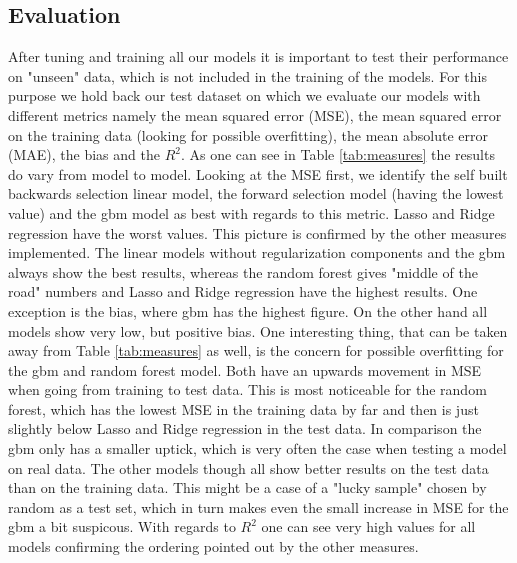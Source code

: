 \subsection{Evaluation}
After tuning and training all our models it is important to test their performance on "unseen" data, which is not included in the training of the models. For this purpose we hold back our test dataset on which we evaluate our models with different metrics namely the mean squared error (MSE), the mean squared error on the training data (looking for possible overfitting), the mean absolute error (MAE), the bias and the $R^2$. As one can see in Table \ref{tab:measures} the results do vary from model to model. Looking at the MSE first, we identify the self built backwards selection linear model, the forward selection model (having the lowest value) and the gbm model as best with regards to this metric. Lasso and Ridge regression have the worst values. This picture is confirmed by the other measures implemented. The linear models without regularization components and the gbm always show the best results, whereas the random forest gives "middle of the road" numbers and Lasso and Ridge regression have the highest results. One exception is the bias, where gbm has the highest figure. On the other hand all models show very low, but positive bias. One interesting thing, that can be taken away from Table \ref{tab:measures} as well, is the concern for possible overfitting for the gbm and random forest model.
Both have an upwards movement in MSE when going from training to test data. This is most noticeable for the random forest, which has the lowest MSE in the training data by far and then is just slightly below Lasso and Ridge regression in the test data. In comparison the gbm only has a smaller uptick, which is very often the case when testing a model on real data. The other models though all show better results on the test data than on the training data. This might be a case of a "lucky sample" chosen by random as a test set, which in turn makes even the small increase in MSE for the gbm a bit suspicous. With regards to $R^2$ one can see very high values for all models confirming the ordering pointed out by the other measures. 





